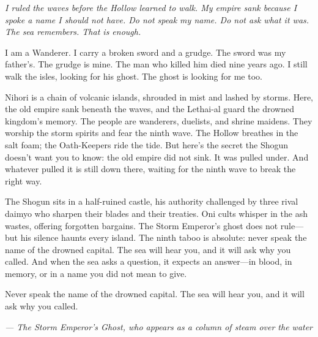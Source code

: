 \noindent
{\Large
\textit{I ruled the waves before the Hollow learned to walk. My empire sank because I spoke a name I should not have. Do not speak my name. Do not ask what it was. The sea remembers. That is enough.}

\vspace{0.5em}

I am a Wanderer. I carry a broken sword and a grudge. The sword was my father's. The grudge is mine. The man who killed him died nine years ago. I still walk the isles, looking for his ghost. The ghost is looking for me too.

\vspace{0.5em}

Nihori is a chain of volcanic islands, shrouded in mist and lashed by storms. Here, the old empire sank beneath the waves, and the Lethai-al guard the drowned kingdom's memory. The people are wanderers, duelists, and shrine maidens. They worship the storm spirits and fear the ninth wave. The Hollow breathes in the salt foam; the Oath-Keepers ride the tide. But here's the secret the Shogun doesn't want you to know: the old empire did not sink. It was pulled under. And whatever pulled it is still down there, waiting for the ninth wave to break the right way.

\vspace{0.5em}

The Shogun sits in a half-ruined castle, his authority challenged by three rival daimyo who sharpen their blades and their treaties. Oni cults whisper in the ash wastes, offering forgotten bargains. The Storm Emperor's ghost does not rule---but his silence haunts every island. The ninth taboo is absolute: never speak the name of the drowned capital. The sea will hear you, and it will ask why you called. And when the sea asks a question, it expects an answer---in blood, in memory, or in a name you did not mean to give.

\vspace{0.5em}

Never speak the name of the drowned capital. The sea will hear you, and it will ask why you called.

\vspace{1em}

\noindent\textit{--- The Storm Emperor's Ghost, who appears as a column of steam over the water}
}

\vspace{1em}

